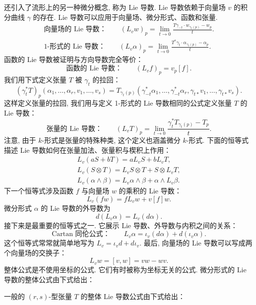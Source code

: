 还引入了流形上的另一种微分概念, 称为 Lie 导数. Lie 导数依赖于向量场 $v$ 的积分曲线 $\gamma$ 的存在. Lie 导数可以应用于向量场、微分形式、函数和张量.
\begin{align*}
\text{向量场的 Lie 导数：}\qquad (L_vw)_p=\lim_{t\to0}\frac{T\gamma_{-t}\cdot w_{\gamma_t(p)}-w_p}{t}. \\
\text{1-形式的 Lie 导数：}\qquad (L_v\alpha)_p=\lim_{t\to0}\frac{T^*\gamma_t\cdot\alpha_{\gamma_t(p)}-\alpha_p}{t}.
\end{align*}
函数的 Lie 导数被证明与方向导数完全等价：
\[
\text{函数的 Lie 导数：}\qquad (L_vf)_p=v_p[f].
\]
我们用下式定义张量 $T$ 被 $\gamma_t$ 的拉回：
\[
\left(\gamma_t^*T\right)_p\left(\alpha_1,\ldots,\alpha_r,v_1,\ldots,v_s\right)
=T_{\gamma_t(p)}\left(\gamma_{-t}^*\alpha_1,\ldots,\gamma_{-t}^*\alpha_r,\gamma_{t*}v_1,\ldots,\gamma_{t*}v_s\right).
\]
这样定义张量的拉回, 我们用与定义 1-形式的 Lie 导数相同的公式定义张量 $T$ 的 Lie 导数：
\[
\text{张量的 Lie 导数：}\qquad (L_vT)_p=\lim_{t\to0}\frac{\gamma_t^*T_{\gamma_t(p)}-T_p}{t}.
\]
注意, 由于 $k$-形式是张量的特殊种类, 这个定义也涵盖微分 $k$-形式. 下面的恒等式描述 Lie 导数如何在张量加法、张量积与楔积上作用：
\begin{align*}
L_v\left(aS+bT\right)=aL_vS+bL_vT, \\
L_v(S\otimes T)=L_vS\otimes T+S\otimes L_vT, \\
L_v(\alpha\wedge\beta)=L_v\alpha\wedge\beta+\alpha\wedge L_v\beta.
\end{align*}
下一个恒等式涉及函数 $f$ 与向量场 $w$ 的乘积的 Lie 导数：
\[
L_v(fw)=fL_vw+v[f]w.
\]
微分形式 $\alpha$ 的 Lie 导数的外导数为
\[
d\left(L_v\alpha\right)=L_v\left(d\alpha\right).
\]
接下来是最重要的恒等式之一. 它展示 Lie 导数、外导数与内积之间的关系：
\[
\text{Cartan 同伦公式：}\qquad L_v\alpha=\iota_v(d\alpha)+d(\iota_v\alpha).
\]
这个恒等式常常就简单地写为 $L_v=\iota_vd+d\iota_v$. 最后, 向量场的 Lie 导数可以写成两个向量场的交换子：
\[
L_vw=[v,w]=vw-wv.
\]
整体公式是不使用坐标的公式. 它们有时被称为坐标无关的公式. 微分形式的 Lie 导数的整体公式由下式给出：
\begin{center}
\end{center}
一般的 $(r,s)$-型张量 $T$ 的整体 Lie 导数公式由下式给出：
\begin{center}
\end{center}
